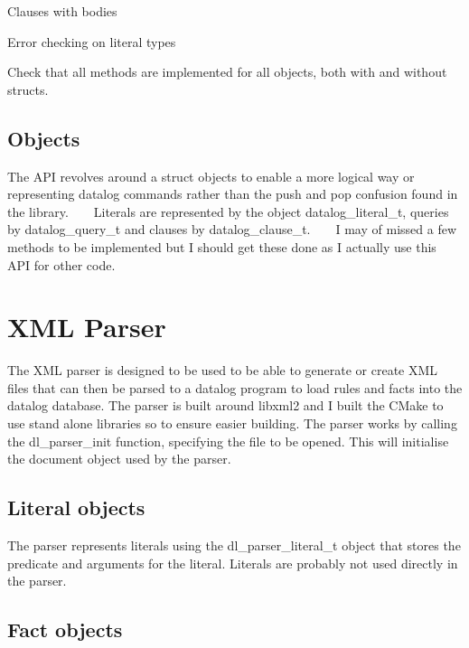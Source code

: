 \begin{DoxyItemize}
\item Clauses with bodies
\item Error checking on literal types
\item Check that all methods are implemented for all objects, both with and without structs. 
\end{DoxyItemize}\hypertarget{index_objects_sec}{}\subsection{Objects}\label{index_objects_sec}
The A\+PI revolves around a struct objects to enable a more logical way or representing datalog commands rather than the push and pop confusion found in the library. ~\newline
~\newline
 Literals are represented by the object datalog\+\_\+literal\+\_\+t, queries by datalog\+\_\+query\+\_\+t and clauses by datalog\+\_\+clause\+\_\+t. ~\newline
~\newline
 I may of missed a few methods to be implemented but I should get these done as I actually use this A\+PI for other code. \hypertarget{index_parser_sec}{}\section{X\+M\+L Parser}\label{index_parser_sec}
The X\+ML parser is designed to be used to be able to generate or create X\+ML files that can then be parsed to a datalog program to load rules and facts into the datalog database. The parser is built around libxml2 and I built the C\+Make to use stand alone libraries so to ensure easier building. The parser works by calling the dl\+\_\+parser\+\_\+init function, specifying the file to be opened. This will initialise the document object used by the parser. \hypertarget{index_literal_sec}{}\subsection{Literal objects}\label{index_literal_sec}
The parser represents literals using the dl\+\_\+parser\+\_\+literal\+\_\+t object that stores the predicate and arguments for the literal. Literals are probably not used directly in the parser. \hypertarget{index_fact_sec}{}\subsection{Fact objects}\label{index_fact_sec}
